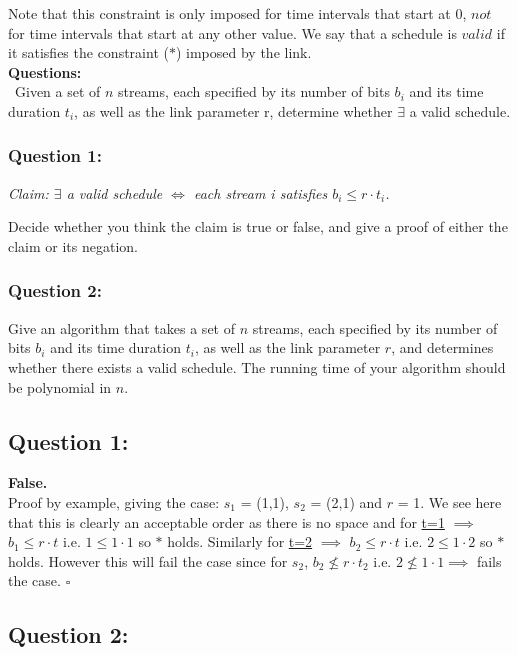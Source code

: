 \documentclass[12pt]{article}
\begin{document}
Note that this constraint is only imposed for time intervals that
start at 0, $not$ for time intervals that start at any other value.
We say that a schedule is $valid$ if it satisfies the constraint
($\ast$) imposed by the link. \\

\textbf{Questions:} \\
~\indent Given a set of $n$ streams, each specified by its number
of bits $b_i$ and its time duration $t_i$, as well as the link
parameter r, determine whether $\exists$ a valid schedule.

\subsubsection{Question 1:}
\begin{center}\textit{Claim: $\exists$ a valid schedule $\iff$
each stream i satisfies $b_i\leq r\cdot t_i$.}\end{center}
Decide whether you think the claim is true or false, and give a
proof of either the claim or its negation.

\subsubsection{Question 2:}
Give an algorithm that takes a set of $n$ streams, each specified
by its number of bits $b_i$ and its time duration $t_i$, as well as
the link parameter $r$, and determines whether there exists a valid
schedule. The running time of your algorithm should be polynomial
in $n$.


\newpage
\subsection{Question 1:}
\textbf{False.} \\
Proof by example, giving the case:  $s_1$ = (1,1), $s_2$ = (2,1)
and $r$ = 1. We see here that this is clearly an acceptable order as
there is no space and for \underline{t=1} $\implies$ $b_1 \leq r\cdot t$
i.e. $1 \leq 1\cdot 1$ so $\ast$ holds. Similarly for \underline{t=2}
$\implies$ $b_2 \leq r\cdot t$ i.e. $2 \leq 1\cdot 2$ so $\ast$ holds.
However this will fail the case since for $s_2$, $b_2 \nleq r\cdot t_2$
i.e. $2 \nleq 1\cdot 1 \implies$ fails the case. $\square$

\subsection{Question 2:}
\end{document}
